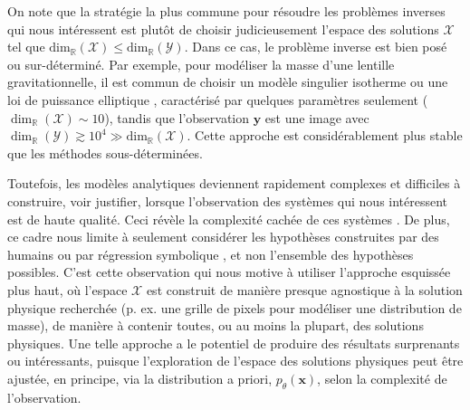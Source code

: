On note que la stratégie la plus commune pour résoudre les problèmes inverses qui nous intéressent est plutôt de 
choisir judicieusement l'espace des solutions $\mathcal{X}$ tel que $\mathrm{dim}_{\mathbb{R}}(\mathcal{X}) \leq \mathrm{dim}_{\mathbb{R}}(\mathcal{Y})$. 
Dans ce cas, le problème inverse est bien posé ou sur-déterminé. 
Par exemple, pour modéliser la masse d'une lentille gravitationnelle, il est commun  
de choisir un modèle singulier isotherme ou une loi de puissance elliptique \citep[e.g.][]{Koopmans2006,Barnabe2009,Auger2010}, 
caractérisé par quelques paramètres seulement 
($\dim_{\mathbb{R}}(\mathcal{X}) \sim 10$), tandis que 
l'observation $\mathbf{y}$ est une image avec $\dim_{\mathbb{R}}(\mathcal{Y}) \gtrsim 10^{4} \gg \mathrm{dim}_{\mathbb{R}}(\mathcal{X})$. 
Cette approche est considérablement plus stable que les méthodes sous-déterminées. 

Toutefois, 
les modèles analytiques deviennent rapidement complexes et difficiles à construire, voir justifier, lorsque l'observation des systèmes qui nous intéressent
est de haute qualité. Ceci révèle la complexité cachée de ces systèmes \citep[e.g.][]{Schuldt2019}.
De plus, ce cadre nous limite à seulement considérer les hypothèses construites par des humains 
ou par régression symbolique \citep[e.g.][]{Lemos2022}, et non l'ensemble des hypothèses possibles.
C'est cette observation qui nous motive à utiliser l'approche esquissée plus haut, 
où l'espace $\mathcal{X}$ est construit de manière presque agnostique à la solution 
physique recherchée (p. ex. une grille de pixels pour modéliser une distribution de masse), 
de manière à contenir toutes, ou au moins la plupart, des solutions physiques. Une telle approche a 
le potentiel de produire des résultats surprenants ou intéressants, puisque l'exploration de l'espace des solutions physiques 
peut être ajustée, en principe, via la distribution a priori, $p_\theta(\mathbf{x})$, selon la complexité de l'observation.

